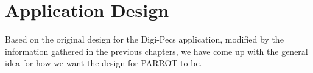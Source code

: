 \chapter{Application Design}
Based on the original design for the Digi-Pecs application, modified by the information gathered in the previous chapters, we have come up with the general idea for how we want the design for PARROT to be.